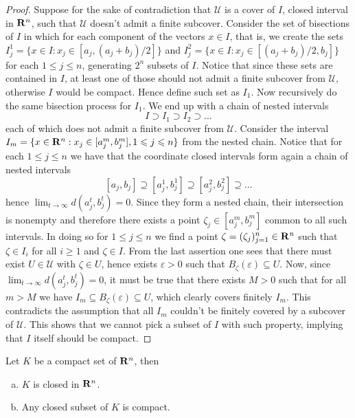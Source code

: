 \begin{proof}
  Suppose for the sake of contradiction that \(\mathcal U\) is a cover of \(I\),
  closed interval in \(\mathbf{R}^n\), such that \(\mathcal U\) doesn't admit a finite
  subcover. Consider the set of bisections of \(I\) in which for each component
  of the vectors \(x \in I\), that is, we create the sets \(I_j^1 = \{x \in I:
  x_j \in [a_j, (a_j + b_j)/2]\}\) and \(I_j^2 = \{x \in I: x_j \in [(a_j +
  b_j)/2, b_j]\}\) for each \(1 \leq j \leq n\), generating \(2^n\) subsets of
  \(I\). Notice that since these sets are contained in \(I\), at least one of
  those should not admit a finite subcover from \(\mathcal U\), otherwise \(I\)
  would be compact. Hence define such set as \(I_1\). Now recursively do the
  same bisection process for \(I_1\). We end up with a chain of nested intervals
  \[
    I \supset I_1 \supset I_2 \supset \dots
  \]
  each of which does not admit a finite subcover from \(\mathcal U\). Consider
  the interval \(I_m = \{x \in \mathbf{R}^n: x_j \in [a^m_j, b_j^m], 1 \leqslant j \leqslant n\}\)
  from the nested chain. Notice that for each \(1 \leq j \leq n\) we have that
  the coordinate closed intervals form again a chain of nested intervals
  \[
    [a_j, b_j] \supseteq [a_j^1, b_j^1] \supseteq [a_j^2, b_j^2] \supseteq \dots
  \]
  hence \(\lim_{t \to \infty} d(a_j^t, b_j^t) = 0\). Since they form a nested
  chain, their intersection is nonempty and therefore there exists a point
  \(\zeta_j \in  [a_j^m, b_j^m]\) common to all such intervals. In doing so for
  \(1 \leq j \leq n\) we find a point \(\zeta = (\zeta_j)_{j=1}^n \in \mathbf{R}^n\)
  such that \(\zeta \in I_i\) for all \(i \geq 1\) and \(\zeta \in I\). From the
  last assertion one sees that there must exist \(U \in \mathcal U\) with
  \(\zeta \in U\), hence exists \(\varepsilon > 0\) such that
  \(B_\zeta(\varepsilon) \subseteq U\). Now, since \(\lim_{t \to \infty}
  d(a_j^t, b_j^t) = 0\), it must be true that there exists \(M > 0\) such that
  for all \(m > M\) we have \(I_m \subseteq B_\zeta(\varepsilon) \subseteq U\),
  which clearly covers finitely \(I_m\). This contradicts the assumption that
  all \(I_m\) couldn't be finitely covered by a subcover of \(\mathcal U\). This
  shows that we cannot pick a subset of \(I\) with such property, implying that
  \(I\) itself should be compact.
\end{proof}

\begin{proposition}\label{prop: compact-close}
  Let \(K\) be a compact set of \(\mathbf{R}^n\), then
  \begin{enumerate}[(a)]
    \item \(K\) is closed in \(\mathbf{R}^n\).
    \item Any closed subset of \(K\) is compact.
  \end{enumerate}
\end{proposition}

